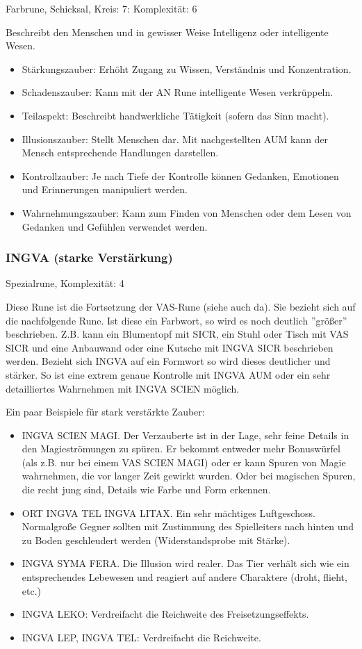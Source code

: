 \documentclass{article}
\begin{document}
Farbrune, Schicksal, Kreis: 7: Komplexität: 6

Beschreibt den Menschen und in gewisser Weise Intelligenz oder intelligente Wesen.

\begin{itemize}
\item Stärkungszauber: Erhöht Zugang zu Wissen, Verständnis und Konzentration.
\item Schadenszauber: Kann mit der AN Rune intelligente Wesen verkrüppeln.
\item Teilaspekt: Beschreibt handwerkliche Tätigkeit (sofern das Sinn macht).
\item Illusionszauber: Stellt Menschen dar. Mit nachgestellten AUM kann der Mensch entsprechende Handlungen darstellen.
\item Kontrollzauber: Je nach Tiefe der Kontrolle können Gedanken, Emotionen und Erinnerungen manipuliert werden.
\item Wahrnehmungszauber: Kann zum Finden von Menschen oder dem Lesen von Gedanken und Gefühlen verwendet werden.
\end{itemize}

\subsubsection{INGVA (starke Verstärkung)}

Spezialrune, Komplexität: 4

Diese Rune ist die Fortsetzung der VAS-Rune (siehe auch da). Sie bezieht sich auf die nachfolgende Rune. Ist diese ein
Farbwort, so wird es noch deutlich ''größer'' beschrieben. Z.B. kann ein Blumentopf mit SICR, ein Stuhl oder Tisch mit
VAS SICR und eine Anbauwand oder eine Kutsche mit INGVA SICR beschrieben werden. Bezieht sich INGVA auf ein Formwort
so wird dieses deutlicher und stärker. So ist eine extrem genaue Kontrolle mit INGVA AUM oder ein sehr
detailliertes Wahrnehmen mit INGVA SCIEN möglich.

Ein paar Beispiele für stark verstärkte Zauber:

\begin{itemize}
\item INGVA SCIEN MAGI. Der Verzauberte ist in der Lage, sehr feine Details in den Magieströmungen zu spüren. Er bekommt entweder mehr Bonuswürfel (als z.B. nur bei einem VAS SCIEN MAGI) oder er kann Spuren von Magie wahrnehmen, die vor langer Zeit gewirkt wurden. Oder bei magischen Spuren, die recht jung sind, Details wie Farbe und Form erkennen.
\item ORT INGVA TEL INGVA LITAX. Ein sehr mächtiges Luftgeschoss. Normalgroße Gegner sollten mit Zustimmung des Spielleiters nach hinten und zu Boden geschleudert werden (Widerstandsprobe mit Stärke).
\item INGVA SYMA FERA. Die Illusion wird realer. Das Tier verhält sich wie ein entsprechendes Lebewesen und reagiert auf andere Charaktere (droht, flieht, etc.)
\item INGVA LEKO: Verdreifacht die Reichweite des Freisetzungseffekts.
\item INGVA LEP, INGVA TEL: Verdreifacht die Reichweite.
\end{itemize}
\end{document}

